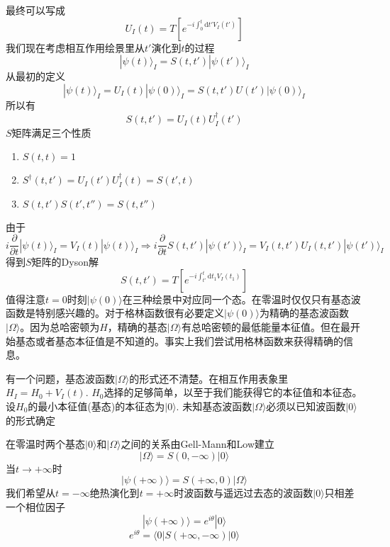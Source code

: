 \documentclass[a4paper,14pt]{article}
\begin{document}
最终可以写成
\begin{equation*}
    U_I(t)=T\left[e^{-i\int_0^t\mathrm{d}t'V_I(t')}\right]
\end{equation*}
我们现在考虑相互作用绘景里从$t'$演化到$t$的过程
\begin{equation*}
    |\psi(t)\rangle_I=S(t,t')|\psi(t')\rangle_I
\end{equation*}
从最初的定义
\begin{equation*}
    |\psi(t)\rangle_I=U_I(t)|\psi(0)\rangle_I=S(t,t')U(t')|\psi(0)\rangle_I
\end{equation*}
所以有
\begin{equation*}
    S(t,t')=U_I(t)U_I^\dagger(t')
\end{equation*}
$S$矩阵满足三个性质
\begin{enumerate}
    \item $S(t,t)=1$
    \item $S^\dagger(t,t')=U_I(t')U_I^\dagger(t)=S(t',t)$
    \item $S(t,t')S(t',t'')=S(t,t'')$
\end{enumerate}
由于
\begin{equation*}
    i\frac{\partial}{\partial t}|\psi(t)\rangle_I=V_I(t)|\psi(t)\rangle_I\Rightarrow i\frac{\partial}{\partial t}S(t,t')|\psi(t')\rangle_I=V_I(t,t')U_I(t,t')|\psi(t')\rangle_I
\end{equation*}
得到$S$矩阵的Dyson解
\begin{equation*}
    S(t,t')=T[e^{-i\int_{t'}^{t}\mathrm{d}t_1V_I(t_1)}]
\end{equation*}
值得注意$t=0$时刻$|\psi(0)\rangle$在三种绘景中对应同一个态。在零温时仅仅只有基态波函数是特别感兴趣的。对于格林函数很有必要定义$|\psi(0)\rangle$为精确的基态波函数$|\Omega\rangle$。因为总哈密顿为$H$，精确的基态$|\Omega\rangle$有总哈密顿的最低能量本征值。但在最开始基态或者基态本征值是不知道的。事实上我们尝试用格林函数来获得精确的信息。

有一个问题，基态波函数$|\Omega\rangle$的形式还不清楚。在相互作用表象里$H_I=H_0+V_I(t)$. $H_0$选择的足够简单，以至于我们能获得它的本征值和本征态。设$H_0$的最小本征值(基态)的本征态为$|0\rangle$. 未知基态波函数$|\Omega\rangle$必须以已知波函数$|0\rangle$的形式确定

在零温时两个基态$|0\rangle$和$|\Omega\rangle$之间的关系由Gell-Mann和Low建立
\begin{equation*}
    |\Omega\rangle=S(0,-\infty)|0\rangle
\end{equation*}
当$t\to+\infty$时
\begin{equation*}
    |\psi(+\infty)\rangle=S(+\infty,0)|\Omega\rangle
\end{equation*}
我们希望从$t=-\infty$绝热演化到$t=+\infty$时波函数与遥远过去态的波函数$|0\rangle$只相差一个相位因子
\begin{equation*}
    |\psi(+\infty)\rangle=e^{i\theta}|0\rangle
\end{equation*}
\begin{equation*}
    e^{i\theta}=\langle0|S(+\infty,-\infty)|0\rangle
\end{equation*}
\end{document}
